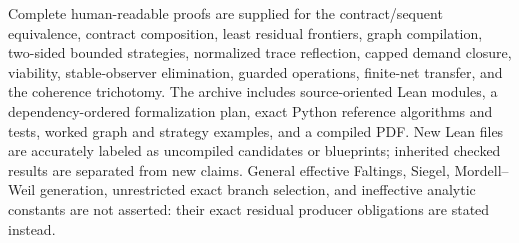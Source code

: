 Complete human-readable proofs are supplied for the contract/sequent equivalence, contract composition, least residual frontiers, graph compilation, two-sided bounded strategies, normalized trace reflection, capped demand closure, viability, stable-observer elimination, guarded operations, finite-net transfer, and the coherence trichotomy.  The archive includes source-oriented Lean modules, a dependency-ordered formalization plan, exact Python reference algorithms and tests, worked graph and strategy examples, and a compiled PDF.  New Lean files are accurately labeled as uncompiled candidates or blueprints; inherited checked results are separated from new claims.  General effective Faltings, Siegel, Mordell--Weil generation, unrestricted exact branch selection, and ineffective analytic constants are not asserted: their exact residual producer obligations are stated instead.
